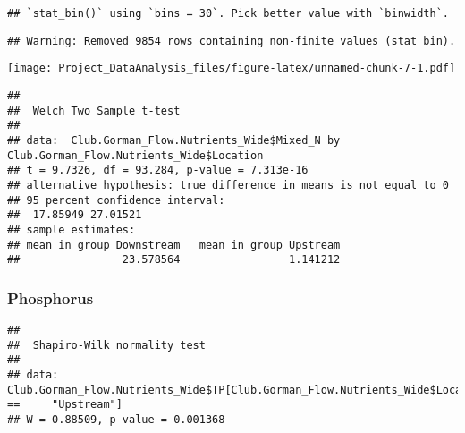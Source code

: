 \documentclass[]{article}
\newenvironment{Shaded}{\begin{snugshade}}{\end{snugshade}}
\newcommand{\KeywordTok}[1]{\textcolor[rgb]{0.13,0.29,0.53}{\textbf{#1}}}
\newcommand{\NormalTok}[1]{#1}
\newcommand{\OperatorTok}[1]{\textcolor[rgb]{0.81,0.36,0.00}{\textbf{#1}}}
\newcommand{\StringTok}[1]{\textcolor[rgb]{0.31,0.60,0.02}{#1}}
\begin{document}
\begin{verbatim}
## `stat_bin()` using `bins = 30`. Pick better value with `binwidth`.
\end{verbatim}

\begin{verbatim}
## Warning: Removed 9854 rows containing non-finite values (stat_bin).
\end{verbatim}

\texttt{[image: Project\_DataAnalysis\_files/figure-latex/unnamed-chunk-7-1.pdf]}

\begin{Shaded}
\end{Shaded}

\begin{verbatim}
## 
##  Welch Two Sample t-test
## 
## data:  Club.Gorman_Flow.Nutrients_Wide$Mixed_N by Club.Gorman_Flow.Nutrients_Wide$Location
## t = 9.7326, df = 93.284, p-value = 7.313e-16
## alternative hypothesis: true difference in means is not equal to 0
## 95 percent confidence interval:
##  17.85949 27.01521
## sample estimates:
## mean in group Downstream   mean in group Upstream 
##                23.578564                 1.141212
\end{verbatim}

\hypertarget{phosphorus-1}{%
\subsubsection{Phosphorus}\label{phosphorus-1}}

\begin{Shaded}
\end{Shaded}

\begin{verbatim}
## 
##  Shapiro-Wilk normality test
## 
## data:  Club.Gorman_Flow.Nutrients_Wide$TP[Club.Gorman_Flow.Nutrients_Wide$Location ==     "Upstream"]
## W = 0.88509, p-value = 0.001368
\end{verbatim}
\end{document}
